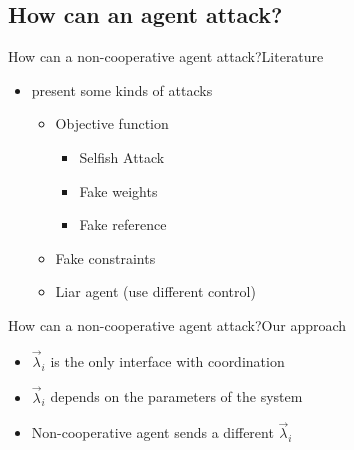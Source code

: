 \documentclass[aspectratio=169]{beamer}
\begin{document}
\subsection{How can an agent attack?}
\begin{frame}{How can a non-cooperative agent attack?}{Literature}

    \begin{itemize}
      \item<1-> \cite{VelardeEtAl2017a,ChanfreutEtAl2018} present some kinds of attacks
            \begin{itemize}
              \item<2-> Objective function
                    \begin{itemize}
                      \item<3-> Selfish Attack
                      \item<4-> Fake weights
                      \item<5-> Fake reference
                    \end{itemize}
              \item<6-> Fake constraints
              \item<7-> Liar agent (use different control)
            \end{itemize}
    \end{itemize}
\end{frame}

\begin{frame}{How can a non-cooperative agent attack?}{Our approach}
  \begin{minipage}[t]{.6\linewidth}
    \begin{itemize}
      \item<1-> $\vec{\lambda}_{i}$ is the only interface with coordination
      \item<2-> $\vec{\lambda}_{i}$ depends on the parameters of the system
      \item<4-> Non-cooperative agent sends a different $\vec{\lambda}_{i}$
    \end{itemize}
    \centering
  \end{minipage}
  \hfill
  \begin{minipage}[t]{.3\linewidth}
    \begin{figure}
      \centering
    \end{figure}
  \end{minipage}
\end{frame}
\end{document}
